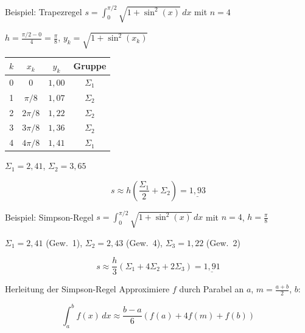 \documentclass[a4paper,fontsize = 7pt]{scrartcl}
\renewcommand*{\arraystretch}{2}
\begin{document}
\begin{subbox}{Beispiel: Trapezregel}
$\displaystyle s = \int_0^{\pi/2} \sqrt{1 + \sin^2(x)}\,dx$ mit $n = 4$

$h = \frac{\pi/2 - 0}{4} = \frac{\pi}{8}$, \quad $y_k = \sqrt{1 + \sin^2(x_k)}$

\renewcommand*{\arraystretch}{1.2}
\begin{center}
\begin{tabular}{c|c|c|c}
$k$ & $x_k$ & $y_k$ & Gruppe \\
\hline
0 & $0$ & $1{,}00$ & $\Sigma_1$ \\
1 & $\pi/8$ & $1{,}07$ & $\Sigma_2$ \\
2 & $2\pi/8$ & $1{,}22$ & $\Sigma_2$ \\
3 & $3\pi/8$ & $1{,}36$ & $\Sigma_2$ \\
4 & $4\pi/8$ & $1{,}41$ & $\Sigma_1$ \\
\end{tabular}
\end{center}

$\Sigma_1 = 2{,}41$, $\Sigma_2 = 3{,}65$

$$s \approx h \left(\frac{\Sigma_1}{2} + \Sigma_2\right) = \underline{1{,}93}$$
\end{subbox}

\begin{subbox}{Beispiel: Simpson-Regel}
$s = \int_0^{\pi/2} \sqrt{1 + \sin^2(x)}\,dx$ mit $n = 4$, $h = \frac{\pi}{8}$

$\Sigma_1 = 2{,}41$ (Gew.\ 1), $\Sigma_2 = 2{,}43$ (Gew.\ 4), $\Sigma_3 = 1{,}22$ (Gew.\ 2)

$$s \approx \frac{h}{3}(\Sigma_1 + 4\Sigma_2 + 2\Sigma_3) = \underline{1{,}91}$$
\end{subbox}

\begin{subbox}{Herleitung der Simpson-Regel}
Approximiere $f$ durch Parabel an $a$, $m = \frac{a+b}{2}$, $b$:

$$\int_a^b f(x)\,dx \approx \frac{b-a}{6}\left(f(a) + 4f(m) + f(b)\right)$$
\end{subbox}
\end{document}
